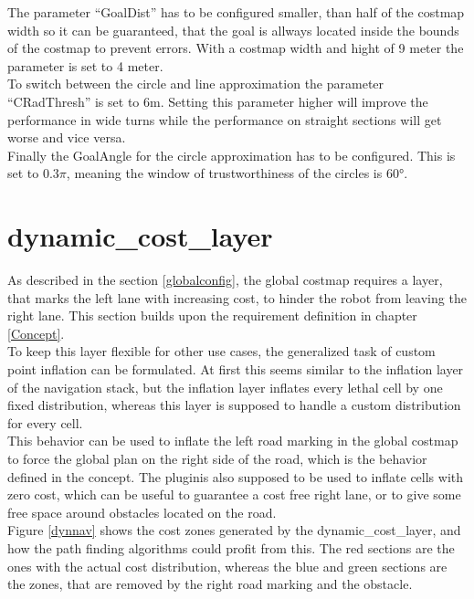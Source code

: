 The parameter ``GoalDist'' has to be configured smaller, than half of the costmap width so it can be guaranteed, that the goal is allways located inside the bounds of the costmap to prevent errors. With a costmap width and hight of 9 meter the parameter is set to 4 meter.\\

To switch between the circle and line approximation the parameter ``CRadThresh'' is set to 6m. Setting this parameter higher will improve the performance in wide turns while the performance on straight sections will get worse and vice versa.\\

Finally the GoalAngle for the circle approximation has to be configured. This is set to $0.3\pi$, meaning the window of trustworthiness of the circles is 60°.



\section{dynamic\_cost\_layer}
As described in the section \ref{globalconfig}, the global costmap requires a layer, that marks the left lane with increasing cost, to hinder the robot from leaving the right lane. This section builds upon the requirement definition in chapter \ref{Concept}.\\


To keep this layer flexible for other use cases, the generalized task of custom point inflation can be formulated. At first this seems similar to the inflation layer of the navigation stack, but the inflation layer inflates every lethal cell by one fixed distribution, whereas this layer is supposed to handle a custom distribution for every cell.\\

This behavior can be used to inflate the left road marking in the global costmap to force the global plan on the right side of the road, which is the behavior defined in the concept. The pluginis also supposed to be used to inflate cells with zero cost, which can be useful to guarantee a cost free right lane, or to give some free space around obstacles located on the road.\\


Figure \ref{dynnav} shows the cost zones generated by the dynamic\_cost\_layer, and how the path finding algorithms could profit from this. The red sections are the ones with the actual cost distribution, whereas the blue and green sections are the zones, that are removed by the right road marking and the obstacle.\\


